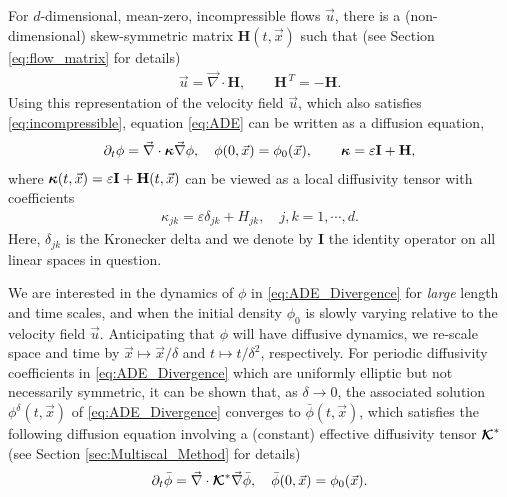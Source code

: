 \documentclass[11pt]{amsart}
\newcommand{\Hb}{\mathbf{H}}
\newcommand{\Ib}{\mathbf{I}}
\newcommand\Kbc{\mbox{\boldmath${\mathcal{K}}$}}
\newcommand\bkappa{\mbox{\boldmath${\kappa}$}}
\begin{document}
For $d$-dimensional, mean-zero, incompressible flows $\vec{u}$, there
is a (non-dimensional) skew-symmetric 
matrix $\Hb(t,\vec{x})$ such that (see Section \ref{eq:flow_matrix}
for details) 
\begin{align}\label{eq:u_DH}
 \vec{u}=\vec{\nabla}\cdot\Hb, \qquad  \Hb^{\,T}=-\Hb.
\end{align}
Using this representation of the velocity field $\vec{u}$, which also
satisfies \eqref{eq:incompressible}, equation \eqref{eq:ADE} can be
written as a diffusion equation,  
%
\begin{align}\label{eq:ADE_Divergence}
  \partial_t\phi%
    =\vec{\nabla}\cdot\bkappa\vec{\nabla}\phi, \quad
    \phi(0,\vec{x})=\phi_0(\vec{x}),
    \qquad
    \bkappa=\varepsilon\Ib+\Hb,
\end{align}
%
where $\bkappa(t,\vec{x})=\varepsilon\Ib+\Hb(t,\vec{x})$ can be viewed as a local
diffusivity tensor with coefficients
%
\begin{align}\label{eq:kappa_coeff}
  \kappa_{jk}=\varepsilon\delta_{jk}+H_{jk},\quad j,k=1,\cdots,d.
\end{align}
%
Here, $\delta_{jk}$ is the Kronecker delta and we denote by $\Ib$ the
identity operator on all linear spaces in question.    






We are interested in the dynamics of $\phi$ in \eqref{eq:ADE_Divergence}
for \emph{large} length and time scales, and when the initial density
$\phi_0$ is slowly varying relative to the velocity field
$\vec{u}$. Anticipating that $\phi$ will have diffusive dynamics, we
re-scale space and time by $\vec{x}\mapsto\vec{x}/\delta$ and $t\mapsto t/\delta^2$,
respectively.  For periodic diffusivity coefficients in
\eqref{eq:ADE_Divergence} which are uniformly elliptic but not
necessarily symmetric, it can be shown \cite{Fannjiang:SIAM_JAM:333}
that, as $\delta\to0$, the associated solution $\phi^\delta(t,\vec{x})$ of
\eqref{eq:ADE_Divergence} converges to $\bar{\phi}(t,\vec{x})$,
which satisfies the following diffusion equation involving a (constant)
effective diffusivity tensor $\Kbc^*$ (see Section
\ref{sec:Multiscal_Method} for details)    
%
\begin{align}\label{eq:phi_bar}
  \partial_t\bar{\phi}=\vec{\nabla}\cdot\Kbc^*\vec{\nabla}\bar{\phi}, \quad
  \bar{\phi}(0,\vec{x})=\phi_0(\vec{x}).
\end{align}
%
\end{document}
